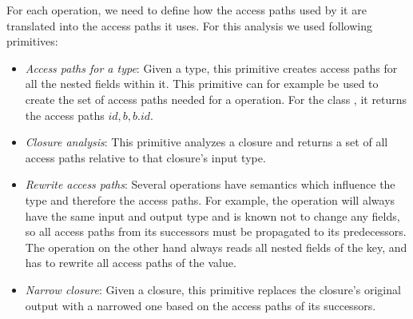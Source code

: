 For each operation, we need to define how the access paths used by it are
translated into the access paths it uses. For this analysis we used following
primitives:
\begin{itemize}
\item \emph{Access paths for a type}: Given a type, this primitive creates
access paths for all the nested fields within it. This primitive can for example
be used to create the set of access paths needed for a  operation.
For the class , it returns the access paths ${id, b, b.id}$.
\item \emph{Closure analysis}: This primitive analyzes a closure and returns a
set of all access paths relative to that closure's input type.
\item \emph{Rewrite access paths}: Several operations have semantics which
influence the type and therefore the access paths. For example, the 
operation will always have the same input and output type and is known not to
change any fields, so all access paths from its successors must be propagated to
its predecessors. The  operation on the other hand always reads
all nested fields of the key, and has to rewrite all access paths of the value.
\item \emph{Narrow closure}: Given a closure, this primitive replaces the
closure's original output with a narrowed one based on the access paths of its
successors.
\end{itemize}

